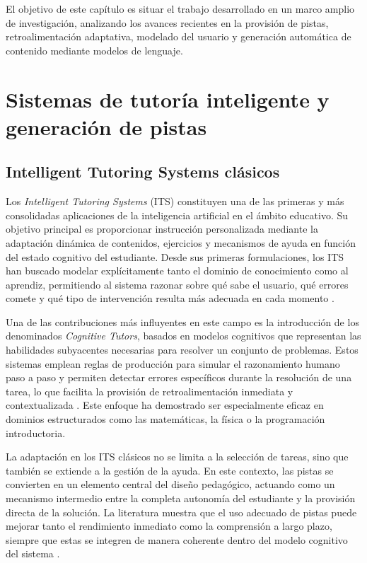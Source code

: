 \documentclass[../main.tex]{subfiles}
\begin{document}
El objetivo de este capítulo es situar el trabajo desarrollado en un marco amplio de investigación, analizando los avances recientes en la provisión de pistas, retroalimentación adaptativa, modelado del usuario y generación automática de contenido mediante modelos de lenguaje.

\section{Sistemas de tutoría inteligente y generación de pistas}

\subsection{Intelligent Tutoring Systems clásicos}

Los \textit{Intelligent Tutoring Systems} (ITS) constituyen una de las primeras y más consolidadas aplicaciones de la inteligencia artificial en el ámbito educativo. Su objetivo principal es proporcionar instrucción personalizada mediante la adaptación dinámica de contenidos, ejercicios y mecanismos de ayuda en función del estado cognitivo del estudiante. Desde sus primeras formulaciones, los ITS han buscado modelar explícitamente tanto el dominio de conocimiento como al aprendiz, permitiendo al sistema razonar sobre qué sabe el usuario, qué errores comete y qué tipo de intervención resulta más adecuada en cada momento \cite{Anderson1995CognitiveTutors, CorbettAnderson1995KT}.

Una de las contribuciones más influyentes en este campo es la introducción de los denominados \textit{Cognitive Tutors}, basados en modelos cognitivos que representan las habilidades subyacentes necesarias para resolver un conjunto de problemas. Estos sistemas emplean reglas de producción para simular el razonamiento humano paso a paso y permiten detectar errores específicos durante la resolución de una tarea, lo que facilita la provisión de retroalimentación inmediata y contextualizada \cite{Anderson1995CognitiveTutors}. Este enfoque ha demostrado ser especialmente eficaz en dominios estructurados como las matemáticas, la física o la programación introductoria.

La adaptación en los ITS clásicos no se limita a la selección de tareas, sino que también se extiende a la gestión de la ayuda. En este contexto, las pistas se convierten en un elemento central del diseño pedagógico, actuando como un mecanismo intermedio entre la completa autonomía del estudiante y la provisión directa de la solución. La literatura muestra que el uso adecuado de pistas puede mejorar tanto el rendimiento inmediato como la comprensión a largo plazo, siempre que estas se integren de manera coherente dentro del modelo cognitivo del sistema \cite{KoedingerAleven2007, VanLehn2006}.
\end{document}
